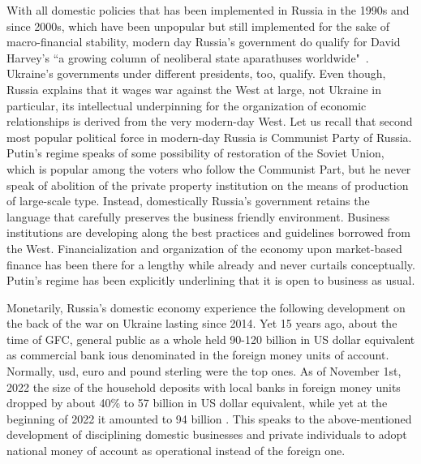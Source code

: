 With all domestic policies that has been implemented in Russia in the
1990s and since 2000s, which have been unpopular but still implemented
for the sake of macro-financial stability, modern day Russia's
government do qualify for David Harvey's ``a growing column of neoliberal
state aparathuses worldwide"~\citep[p.~29]{dharvey}. Ukraine's governments
under different presidents, too, qualify. Even though, Russia explains
that it wages war against the West at large, not Ukraine in particular,
its intellectual underpinning for the organization of economic
relationships is derived from the very modern-day West. Let us recall
that second most popular political force in modern-day Russia is
Communist Party of Russia. Putin's regime speaks of some possibility of
restoration of the Soviet Union, which is popular among the voters who
follow the Communist Part, but he never speak of abolition of the
private property institution on the means of production of large-scale
type. Instead, domestically Russia's government retains the language
that carefully preserves the business friendly environment. Business
institutions are developing along the best practices and guidelines
borrowed from the West. Financialization and organization of the economy
upon market-based finance has been there for a lengthy while already and
never curtails conceptually. Putin's regime has been explicitly
underlining that it is open to business as usual.

Monetarily, Russia's domestic economy experience the following
development on the back of the war on Ukraine lasting since 2014. Yet 15
years ago, about the time of GFC, general public as a whole held 90-120
billion in US dollar equivalent as commercial bank \acp{iou} denominated in
the foreign money units of account. Normally, \acf{usd}, euro and pound
sterling were the top ones. As of November 1st, 2022 the size of the
household deposits with local banks in foreign money units dropped by
about 40\% to 57 billion in US dollar equivalent, while yet at the
beginning of 2022 it amounted to 94 billion \citep{zadornov}. This speaks to
the above-mentioned development of disciplining domestic businesses and
private individuals to adopt national money of account as
operational instead of the foreign one.

